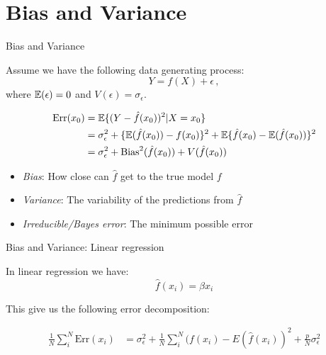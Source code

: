 \documentclass[10pt]{beamer}
\begin{document}



\section{Bias and Variance}
\frame{\sectionpage}

\begin{frame}{Bias and Variance}

Assume we have the following data generating process:
\[
Y = f(X) + \epsilon\,,
\]
where $\operatorname{\mathbb{E}}(\epsilon)=0$ and $V(\epsilon)=\sigma_\epsilon$.

\begin{align*}
\text{Err}(x_0) &= \operatorname{\mathbb{E}}\{(Y-\hat{f}(x_0))^2 | X = x_0\} \\
  &= \sigma^2_\epsilon + \{\operatorname{\mathbb{E}}(\hat{f}(x_0)) - f(x_0)\}^2 + \operatorname{\mathbb{E}}\{\hat{f}(x_0) - \operatorname{\mathbb{E}}(\hat{f}(x_0))\}^2 \\
  &= \sigma^2_\epsilon + \text{Bias}^2(\hat{f}(x_0)) + V(\hat{f}(x_0))
\end{align*}

\begin{itemize}
\item \emph{Bias}: How close can $\hat{f}$ get to the true model $f$
\item \emph{Variance}: The variability of the predictions from $\hat{f}$
\item \emph{Irreducible/Bayes error}: The minimum possible error
\end{itemize}

\end{frame}


\begin{frame}{Bias and Variance: Linear regression}

In linear regression we have:
\[
\hat{f}(x_i) = \hat{\beta} x_i
\]

This give us the following error decomposition:

\begin{align*}
\frac{1}{N}\sum^N_i \text{Err}(x_i) &= \sigma^2_\epsilon + \frac{1}{N}\sum^N_i (f(x_i) - E(\hat{f}(x_i))^2 + \frac{p}{N} \sigma^2_\epsilon
\end{align*}

\end{frame}
\end{document}
